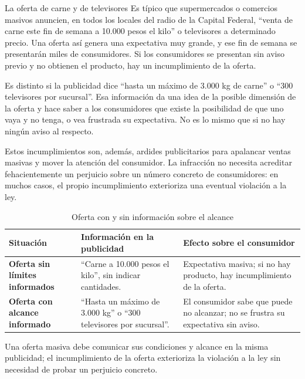 \documentclass[12pt,oneside]{book}
\begin{document}
\begin{example}{La oferta de carne y de televisores}
Es típico que supermercados o comercios masivos anuncien, en todos los locales del radio de la Capital Federal, ``venta de carne este fin de semana a 10.000 pesos el kilo'' o televisores a determinado precio. Una oferta así genera una expectativa muy grande, y ese fin de semana se presentarán miles de consumidores. Si los consumidores se presentan sin aviso previo y no obtienen el producto, hay un incumplimiento de la oferta.

Es distinto si la publicidad dice ``hasta un máximo de 3.000 kg de carne'' o ``300 televisores por sucursal''. Esa información da una idea de la posible dimensión de la oferta y hace saber a los consumidores que existe la posibilidad de que uno vaya y no tenga, o vea frustrada su expectativa. No es lo mismo que si no hay ningún aviso al respecto.
\end{example}

Estos incumplimientos son, además, ardides publicitarios para apalancar ventas masivas y mover la atención del consumidor. La infracción no necesita acreditar fehacientemente un perjuicio sobre un número concreto de consumidores: en muchos casos, el propio incumplimiento exterioriza una eventual violación a la ley.

\begin{table}[H]
\centering
\caption{Oferta con y sin información sobre el alcance}
\small
\begin{tabularx}{\textwidth}{
    >{\raggedright\arraybackslash}p{}
    >{\raggedright\arraybackslash}X
    >{\raggedright\arraybackslash}X
}
\toprule
\textbf{Situación} & \textbf{Información en la publicidad} & \textbf{Efecto sobre el consumidor} \\
\midrule
\textbf{Oferta sin límites informados} & ``Carne a 10.000 pesos el kilo'', sin indicar cantidades. & Expectativa masiva; si no hay producto, hay incumplimiento de la oferta. \\
\textbf{Oferta con alcance informado} & ``Hasta un máximo de 3.000 kg'' o ``300 televisores por sucursal''. & El consumidor sabe que puede no alcanzar; no se frustra su expectativa sin aviso. \\
\bottomrule
\end{tabularx}
\end{table}

\begin{important}
Una oferta masiva debe comunicar sus condiciones y alcance en la misma publicidad; el incumplimiento de la oferta exterioriza la violación a la ley sin necesidad de probar un perjuicio concreto.
\end{important}
\end{document}

